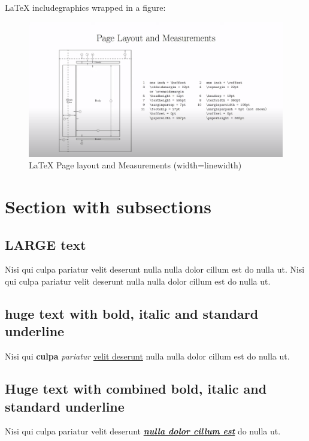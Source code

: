 \documentclass[12pt]{article}
\begin{document}
\noindent LaTeX includegraphics wrapped in a figure: \\
\begin{figure}[ht!]
    \centering
    \includegraphics[width=\linewidth]{page_layout.png}
    \caption{LaTeX Page layout and Measurements (width=linewidth)}
    \label{hr_3}
\end{figure}

\section{Section with subsections}

\subsection{LARGE text}
{\LARGE \indent Nisi qui culpa pariatur velit deserunt nulla nulla dolor cillum est do nulla ut. Nisi qui culpa pariatur velit deserunt nulla nulla dolor cillum est do nulla ut.}

\subsection{huge text with bold, italic and standard underline}
{\huge \indent Nisi qui \textbf{culpa} \textit{pariatur} \underline{velit deserunt} nulla nulla dolor cillum est do nulla ut.} \\

\subsection{Huge text with combined bold, italic and standard underline}
{\Huge \indent Nisi qui culpa pariatur velit deserunt \underline{\textbf{\textit{nulla dolor cillum est}}} do nulla ut.} \\
\end{document}
